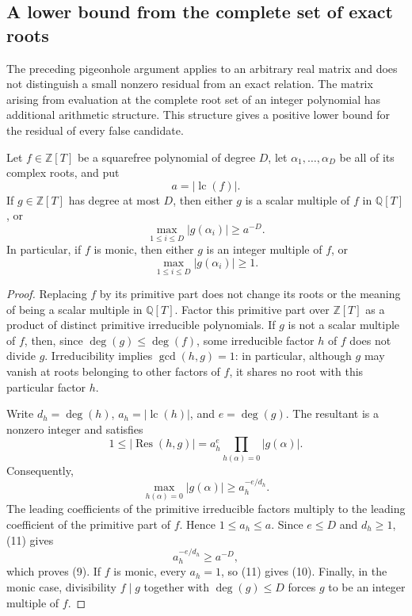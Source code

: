 \documentclass{weeklyprogress}
\begin{document}
\subsection{A lower bound from the complete set of exact roots}

The preceding pigeonhole argument applies to an arbitrary real matrix and
does not distinguish a small nonzero residual from an exact relation.  The
matrix arising from evaluation at the complete root set of an integer
polynomial has additional arithmetic structure.  This structure gives a
positive lower bound for the residual of every false candidate.

\begin{proposition}\label{prop:all-roots-gap}
Let $f\in\mathbb{Z}[T]$ be a squarefree polynomial of degree $D$, let
$\alpha_1,\ldots,\alpha_D$ be all of its complex roots, and put
\[
 a=|\operatorname{lc}(f)|.
\]
If $g\in\mathbb{Z}[T]$ has degree at most $D$, then either $g$ is a scalar
multiple of $f$ in $\mathbb{Q}[T]$, or
\[
 \max_{1\leq i\leq D}|g(\alpha_i)|\geq a^{-D}.
 \tag{9}
\]
In particular, if $f$ is monic, then either $g$ is an integer multiple of
$f$, or
\[
 \max_{1\leq i\leq D}|g(\alpha_i)|\geq1.
 \tag{10}
\]
\end{proposition}

\begin{proof}
Replacing $f$ by its primitive part does not change its roots or the meaning
of being a scalar multiple in $\mathbb{Q}[T]$.  Factor this primitive part
over $\mathbb{Z}[T]$ as a product of distinct primitive irreducible
polynomials.  If $g$ is not a scalar multiple of $f$, then, since
$\deg(g)\leq\deg(f)$, some irreducible factor $h$ of $f$ does not divide
$g$.  Irreducibility implies $\gcd(h,g)=1$: in particular, although $g$ may
vanish at roots belonging to other factors of $f$, it shares no root with
this particular factor $h$.

Write $d_h=\deg(h)$, $a_h=|\operatorname{lc}(h)|$, and $e=\deg(g)$.  The
resultant is a nonzero integer and satisfies
\[
 1\leq |\operatorname{Res}(h,g)|
 =a_h^e\prod_{h(\alpha)=0}|g(\alpha)|.
\]
Consequently,
\[
 \max_{h(\alpha)=0}|g(\alpha)|
 \geq a_h^{-e/d_h}.
 \tag{11}
\]
The leading coefficients of the primitive irreducible factors multiply to
the leading coefficient of the primitive part of $f$.  Hence
$1\leq a_h\leq a$.  Since $e\leq D$ and $d_h\geq1$, (11) gives
\[
 a_h^{-e/d_h}\geq a^{-D},
\]
which proves (9).  If $f$ is monic, every $a_h=1$, so (11) gives (10).
Finally, in the monic case, divisibility $f\mid g$ together with
$\deg(g)\leq D$ forces $g$ to be an integer multiple of $f$.
\end{proof}
\end{document}
